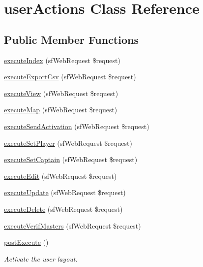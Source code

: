 \hypertarget{classuser_actions}{\section{user\-Actions Class Reference}
\label{classuser_actions}
}
\subsection*{Public Member Functions}
\begin{DoxyCompactItemize}
\item 
\hyperlink{classuser_actions_a948cc911eb1d9f77990be54af3b2080f}{execute\-Index} (sf\-Web\-Request \$request)
\item 
\hyperlink{classuser_actions_af6dc41baf6bd4b0d3892c08cbcb1558c}{execute\-Export\-Csv} (sf\-Web\-Request \$request)
\item 
\hyperlink{classuser_actions_ad61d212fa3f7e8cb4190700a8a670606}{execute\-View} (sf\-Web\-Request \$request)
\item 
\hyperlink{classuser_actions_ae9952e1b1892d29918c14b74fd8dac94}{execute\-Map} (sf\-Web\-Request \$request)
\item 
\hyperlink{classuser_actions_a681685fe6bcc90023d6d37d14df2021e}{execute\-Send\-Activation} (sf\-Web\-Request \$request)
\item 
\hyperlink{classuser_actions_a789d34a9f506e5aa7de58305679bb480}{execute\-Set\-Player} (sf\-Web\-Request \$request)
\item 
\hyperlink{classuser_actions_a1eaacff66375d0cbdfb4efb692ad7724}{execute\-Set\-Captain} (sf\-Web\-Request \$request)
\item 
\hyperlink{classuser_actions_af4d8fedd4b28f3398826a1bb8fa54394}{execute\-Edit} (sf\-Web\-Request \$request)
\item 
\hyperlink{classuser_actions_af7b4f51862add3c2ebb54efc136a0840}{execute\-Update} (sf\-Web\-Request \$request)
\item 
\hyperlink{classuser_actions_a52b5b11b11a0070dd2662257520c045a}{execute\-Delete} (sf\-Web\-Request \$request)
\item 
\hyperlink{classuser_actions_a5da86cc93fa4a1e519ff33e216d78735}{execute\-Verif\-Masters} (sf\-Web\-Request \$request)
\item 
\hyperlink{classuser_actions_a280691734d178cb722636ee29bd92cdb}{post\-Execute} ()
\begin{DoxyCompactList}\small\item\em Activate the user layout. \end{DoxyCompactList}\item 

\end{DoxyCompactItemize}
